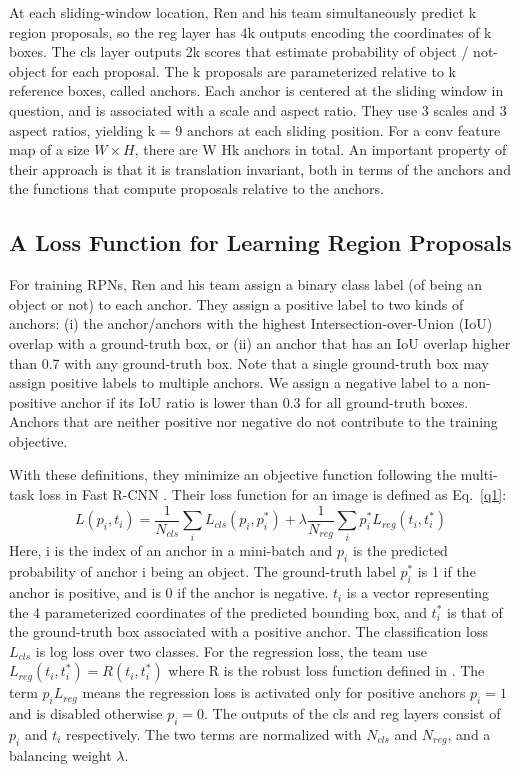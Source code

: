 \documentclass[10pt,twocolumn,letterpaper]{article}
\begin{document}
At each sliding-window location, Ren and his team simultaneously predict k region proposals, so the reg layer has 4k outputs encoding the coordinates of k boxes. The cls layer outputs 2k scores that estimate probability of object / not-object for each proposal. The k proposals are parameterized relative to k reference boxes, called anchors. Each anchor is centered at the sliding window in question, and is associated with a scale and aspect ratio. They use 3 scales and 3 aspect ratios, yielding k = 9 anchors at each sliding position. For a conv feature map of a size $W\times H$, there are W Hk anchors in total. An important property of their approach is that it is translation invariant, both in terms of the anchors and the functions that compute proposals relative to the anchors.

\subsection{A Loss Function for Learning Region Proposals}

For training RPNs, Ren and his team assign a binary class label (of being an object or not) to each anchor. They assign a positive label to two kinds of anchors: (i) the anchor/anchors with the highest Intersection-over-Union (IoU) overlap with a ground-truth box, or (ii) an anchor that has an IoU overlap higher than 0.7 with any ground-truth box. Note that a single ground-truth box may assign positive labels to multiple anchors. We assign a negative label to a non-positive anchor if its IoU ratio is lower than 0.3 for all ground-truth boxes. Anchors that are neither positive nor negative do not contribute to the training objective.

With these definitions, they minimize an objective function following the multi-task loss in Fast R-CNN \cite{Girshick2015Fast}. Their loss function for an image is defined as Eq.~\ref{q1}:
\begin{equation}
L({p_i},{t_i})=\frac{1}{N_{cls}}\sum_{i}L_{cls}(p_i,p_i^*)+\lambda\frac{1}{N_{reg}}\sum_{i}p_i^*L_{reg}(t_i,t_i^*) \label{q1}
\end{equation}
Here, i is the index of an anchor in a mini-batch and $p_i$ is the predicted probability of anchor i being an object. The ground-truth label $p_i^*$ is 1 if the anchor is positive, and is 0 if the anchor is negative. $t_i$ is a vector representing the 4 parameterized coordinates of the predicted bounding box, and $t_i^*$ is that of the ground-truth box associated with a positive anchor. The classification loss $L_{cls}$ is log loss over two classes. For the regression loss, the team use $L_{reg}(t_i, t_i^* ) = R(t_i, t_i^* )$ where R is the robust loss function defined in \cite{Girshick2015Fast}. The term $p_iL_{reg}$ means the regression loss is activated only for positive anchors $p_i=1$ and is disabled otherwise $p_i=0$. The outputs of the cls and reg layers consist of ${p_i}$ and ${t_i}$ respectively. The two terms are normalized with $N_{cls}$ and $N_{reg}$, and a balancing weight $\lambda$.
\end{document}
